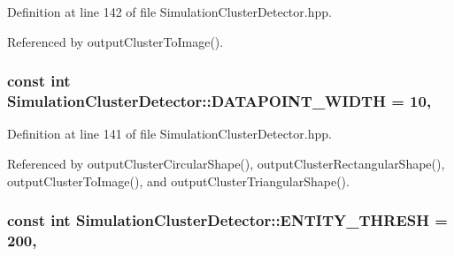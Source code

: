Definition at line 142 of file Simulation\-Cluster\-Detector.\-hpp.



Referenced by output\-Cluster\-To\-Image().

\hypertarget{classmultiscale_1_1analysis_1_1SimulationClusterDetector_a16d99d22863feed83960e6b9efe407a2}{
\subsubsection[{D\-A\-T\-A\-P\-O\-I\-N\-T\-\_\-\-W\-I\-D\-T\-H}]{\setlength{\rightskip}{0pt plus 5cm}const int Simulation\-Cluster\-Detector\-::\-D\-A\-T\-A\-P\-O\-I\-N\-T\-\_\-\-W\-I\-D\-T\-H = 10\hspace{0.3cm}{\ttfamily [static]}, {\ttfamily [private]}}}\label{classmultiscale_1_1analysis_1_1SimulationClusterDetector_a16d99d22863feed83960e6b9efe407a2}


Definition at line 141 of file Simulation\-Cluster\-Detector.\-hpp.



Referenced by output\-Cluster\-Circular\-Shape(), output\-Cluster\-Rectangular\-Shape(), output\-Cluster\-To\-Image(), and output\-Cluster\-Triangular\-Shape().

\hypertarget{classmultiscale_1_1analysis_1_1SimulationClusterDetector_ad161524f0da7d2414e616fff59f02118}{
\subsubsection[{E\-N\-T\-I\-T\-Y\-\_\-\-T\-H\-R\-E\-S\-H}]{\setlength{\rightskip}{0pt plus 5cm}const int Simulation\-Cluster\-Detector\-::\-E\-N\-T\-I\-T\-Y\-\_\-\-T\-H\-R\-E\-S\-H = 200\hspace{0.3cm}{\ttfamily [static]}, {\ttfamily [private]}}}\label{classmultiscale_1_1analysis_1_1SimulationClusterDetector_ad161524f0da7d2414e616fff59f02118}


